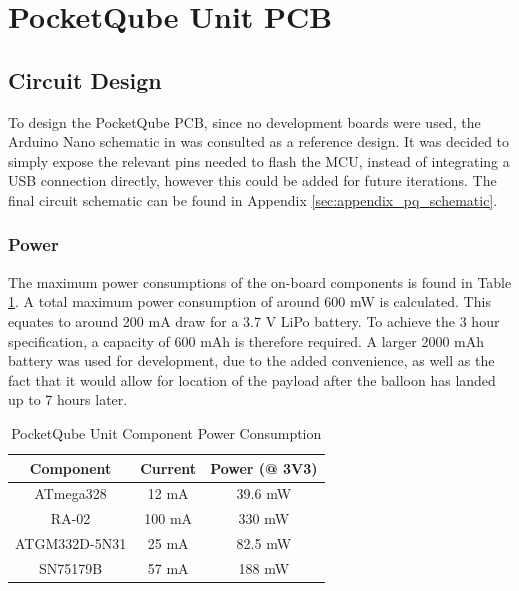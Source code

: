 \graphicspath{{./figures}}

\section{PocketQube Unit PCB}
\subsection{Circuit Design}
To design the PocketQube PCB, since no development boards were used, the Arduino Nano schematic in \cite{design-arduinoNano} was consulted as a reference design. It was decided to simply expose the relevant pins needed to flash the MCU, instead of integrating a USB connection directly, however this could be added for future iterations. The final circuit schematic can be found in Appendix \ref{sec:appendix_pq_schematic}.

\subsubsection{Power}
The maximum power consumptions of the on-board components is found in Table \ref{tab:pqunit_component_consumption}. A total maximum power consumption of around 600 mW is calculated. This equates to around 200 mA draw for a 3.7 V LiPo battery. To achieve the 3 hour specification, a capacity of 600 mAh is therefore required. A larger 2000 mAh battery was used for development, due to the added convenience, as well as the fact that it would allow for location of the payload after the balloon has landed up to 7 hours later.
\begin{table}[!htb]
  \centering
  \renewcommand{\arraystretch}{1.2}
  \begin{tabular}{ |c|c|c| }
  \hline
  \textbf{Component}        & \textbf{Current}        & \textbf{Power (@ 3V3)}      \\ \hline 
  ATmega328                 & 12 mA                   & 39.6 mW                     \\ \hline 
  RA-02                     & 100 mA                  & 330 mW                      \\ \hline 
  ATGM332D-5N31             & 25 mA                   & 82.5 mW                     \\ \hline
  SN75179B                  & 57 mA                   & 188 mW                      \\ \hline
  \end{tabular}
  \caption{PocketQube Unit Component Power Consumption}
  \label{tab:pqunit_component_consumption}
\end{table}


